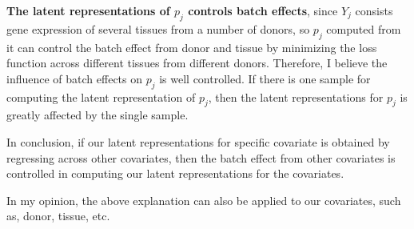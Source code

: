 \documentclass[10]{article}
\begin{document}
    \textbf{The latent representations of $p_j$ controls batch effects}, since $Y_j$ consists gene expression of several tissues from a number of donors, so $p_j$ computed from it can control the batch effect from donor and tissue by minimizing the loss function across different tissues from different donors. Therefore, I believe the influence of batch effects on $p_j$ is well controlled. If there is one sample for computing the latent representation of $p_j$, then the latent representations for $p_j$ is greatly affected by the single sample.

    In conclusion, if our latent representations for specific covariate is obtained by regressing across other covariates, then the batch effect from other covariates is controlled in computing our latent representations for the covariates.

    In my opinion, the above explanation can also be applied to our covariates, such as, donor, tissue, etc. 
  
\newpage
\printbibliography
\end{document}
